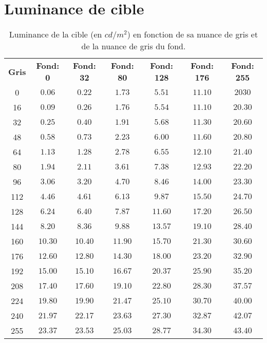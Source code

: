 	\section*{Luminance de cible}
	\begin{table}[h]	
		\centering
		\caption{Luminance de la cible (en $cd/m^2$) en fonction de sa nuance de gris et de la nuance de gris du fond.}
		\label{tab:mesure_luminance_cible}
		\small
		\begin{tabular}{ccccccc}
			\textbf{Gris} & \textbf{Fond: 0} & \textbf{Fond: 32} & \textbf{Fond: 80} & \textbf{Fond: 128} & \textbf{Fond: 176} & \textbf{Fond: 255}\\
			0 & $0.06$ & $0.22$ & $1.73$ & $5.51$ & $11.10$ & $2030$\\
			16 & $0.09$ & $0.26$ & $1.76$ & $5.54$ & $11.10$ & $20.30$\\
			32 & $0.25$ & $0.40$ & $1.91$ & $5.68$ & $11.30$ & $20.60$\\
			48 & $0.58$ & $0.73$ & $2.23$ & $6.00$ & $11.60$ & $20.80$\\
			64 & $1.13$ & $1.28$ & $2.78$ & $6.55$ & $12.10$ & $21.40$\\
			80 & $1.94$ & $2.11$ & $3.61$ & $7.38$ & $12.93$ & $22.20$\\
			96 & $3.06$ & $3.20$ & $4.70$ & $8.46$ & $14.00$ & $23.30$\\
			112 & $4.46$ & $4.61$ & $6.13$ & $9.87$ & $15.50$ & $24.70$\\
			128 & $6.24$ & $6.40$ & $7.87$ & $11.60$ & $17.20$ & $26.50$\\
			144 & $8.20$ & $8.36$ & $9.88$ & $13.57$ & $19.10$ & $28.40$\\
			160 & $10.30$ & $10.40$ & $11.90$ & $15.70$ & $21.30$ & $30.60$\\
			176 & $12.60$ & $12.80$ & $14.30$ & $18.00$ & $23.20$ & $32.90$\\
			192 & $15.00$ & $15.10$ & $16.67$ & $20.37$ & $25.90$ & $35.20$\\
			208 & $17.40$ & $17.60$ & $19.10$ & $22.80$ & $28.30$ & $37.57$\\
			224 & $19.80$ & $19.90$ & $21.47$ & $25.10$ & $30.70$ & $40.00$\\
			240 & $21.97$ & $22.17$ & $23.63$ & $27.30$ & $32.87$ & $42.07$\\
			255 & $23.37$ & $23.53$ & $25.03$ & $28.77$ & $34.30$ & $43.40$\\
		\end{tabular}
	\end{table}
		
%	

